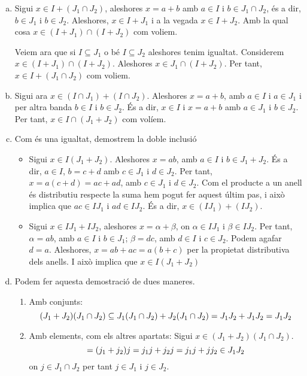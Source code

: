 \documentclass[../main.tex]{subfiles}
\begin{document}
\begin{sol}
\begin{enumerate}[(a)]
    \item Sigui $x\in I+(J_1\cap J_2)$, aleshores $x=a+b$ amb $a\in I$ i $b\in J_1\cap J_2$, és a dir, $b\in J_1$ i $b\in J_2$. Aleshores, $x \in I+J_1$ i a la vegada $x\in I+J_2$. Amb la qual cosa $x\in (I+J_1)\cap(I+J_2)$ com voliem.
    
    Veiem ara que si $I\subseteq J_1$ o bé $I\subseteq J_2$ aleshores tenim igualtat. Considerem $x \in (I+J_1)\cap(I+J_2)$. Aleshores $x\in J_1 \cap (I+J_2)$. Per tant, $x\in I+(J_1\cap J_2)$ com voliem. 
    
    \item Sigui ara $x\in (I\cap J_1)+(I\cap J_2)$. Aleshores $x=a+b$, amb $a\in I$ i $a\in J_1$ i per altra banda $b\in I$ i $b\in J_2$. És a dir, $x\in I$ i $x=a+b$ amb $a\in J_1$ i $b\in J_2$. Per tant, $x\in I\cap (J_1+J_2)$ com volíem.
    
    \item Com és una igualtat, demostrem la doble inclusió
    \begin{itemize}
        \item \fbox{$\subseteq$} Sigui $x\in I(J_1+J_2)$. Aleshores $x=ab$, amb $a\in I$ i $b\in J_1+J_2$. És a dir, $a\in I$, $b=c+d$ amb $c\in J_1$ i $d\in J_2$. Per tant, $x=a(c+d)=ac+ad$, amb $c\in J_1$ i $d\in J_2$. Com el producte a un anell és distributiu respecte la suma hem pogut fer aquest últim pas, i això implica que $ac\in IJ_1$ i $ad \in IJ_2$. És a dir, $x\in (IJ_1)+(IJ_2)$.
        \item \fbox{$\supseteq$} Sigui $x\in IJ_1+IJ_2$, aleshores $x=\alpha + \beta$, on $\alpha \in IJ_1$ i $\beta \in IJ_2$. Per tant, $\alpha =ab$, amb $a\in I$ i $b\in J_1$; $\beta =dc$, amb $d\in I$ i $c \in J_2$. Podem agafar $d=a$. Aleshores, $x=ab+ac=a(b+c)$ per la propietat distributiva dels anells. I això implica que $x\in I(J_1+J_2)$
    \end{itemize}
    
    \item Podem fer aquesta demostració de dues maneres.
    \begin{enumerate}[(1)]
        \item Amb conjunts:
        \begin{equation}
            \notag
            (J_1+J_2)(J_1\cap J_2) \subseteq J_1(J_1\cap J_2)+J_2(J_1\cap J_2) = J_1J_2+J_1J_2=J_1J_2
        \end{equation}
        \item Amb elements, com els altres apartats: Sigui $x\in (J_1+J_2)(J_1 \cap J_2)$.
        \begin{equation}
            \notag =(j_1+j_2)j=j_1j+j_2j=j_1j+jj_2 \in J_1J_2
        \end{equation}
        on $j\in J_1\cap J_2$ per tant $j\in J_1$ i $j\in J_2$.
    \end{enumerate}
\end{enumerate}
\end{sol}
\end{document}

